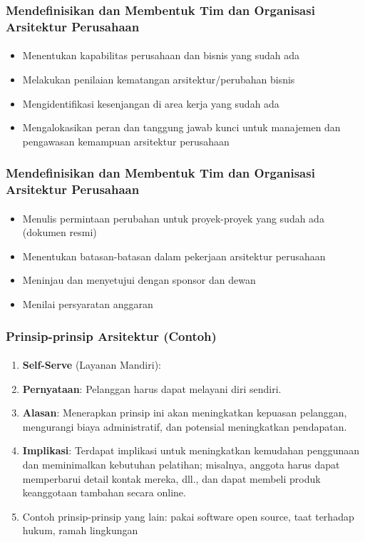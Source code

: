 \documentclass[aspectratio=169, table]{beamer}
\begin{document}
	
	\begin{frame}
		\frametitle{Mendefinisikan dan Membentuk Tim dan Organisasi Arsitektur Perusahaan}
		\framesubtitle{\hspace{0.5cm}}
		\begin{itemize}
			\item Menentukan kapabilitas perusahaan dan bisnis yang sudah ada
			\item Melakukan penilaian kematangan arsitektur/perubahan bisnis
			\item Mengidentifikasi kesenjangan di area kerja yang sudah ada
			\item Mengalokasikan peran dan tanggung jawab kunci untuk manajemen dan pengawasan kemampuan arsitektur perusahaan
		\end{itemize}
	\end{frame}
	
	\begin{frame}
		\frametitle{Mendefinisikan dan Membentuk Tim dan Organisasi  Arsitektur Perusahaan}
		\framesubtitle{\hspace{0.3cm}}
		\begin{itemize}
			\item Menulis permintaan perubahan untuk proyek-proyek yang sudah ada (dokumen resmi)
			\item Menentukan batasan-batasan dalam pekerjaan arsitektur perusahaan
			\item Meninjau dan menyetujui dengan sponsor dan dewan
			\item Menilai persyaratan anggaran
		\end{itemize}
	\end{frame}
	
	\begin{frame}
		\frametitle{Prinsip-prinsip Arsitektur (Contoh)}
		\framesubtitle{\hspace{1cm}}
		\begin{enumerate}
			\item \textbf{Self-Serve} (Layanan Mandiri):
			\item \textbf{Pernyataan}: Pelanggan harus dapat melayani diri sendiri.
			\item \textbf{Alasan}: Menerapkan prinsip ini akan meningkatkan kepuasan pelanggan, mengurangi biaya administratif, dan potensial meningkatkan pendapatan.
			\item \textbf{Implikasi}: Terdapat implikasi untuk meningkatkan kemudahan penggunaan dan meminimalkan kebutuhan pelatihan; misalnya, anggota harus dapat memperbarui detail kontak mereka, dll., dan dapat membeli produk keanggotaan tambahan secara online.
			\item Contoh prinsip-prinsip yang lain: pakai software open source, taat terhadap hukum, ramah lingkungan
		\end{enumerate}
	\end{frame}
	
\end{document}
